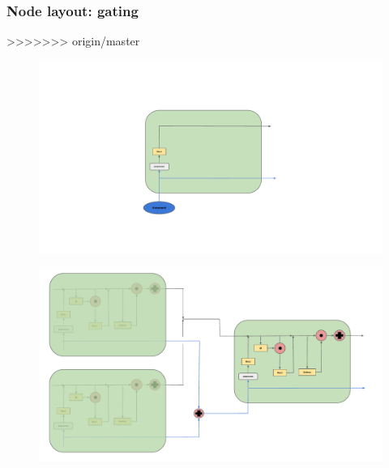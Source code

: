 \subsubsection{Node layout: gating}
>>>>>>> origin/master


\begin{figure}
    \begin{center}
        \includegraphics[width=\textwidth]{Images/Schema_RecNN_Leaf.pdf}
        \label{sub:RecNNLeafNode}
    
        \includegraphics[width=\textwidth]{Images/Schema_RecNN.pdf}
        \label{sub:RecNNNode}
    
    

\end{center}
\end{figure}
